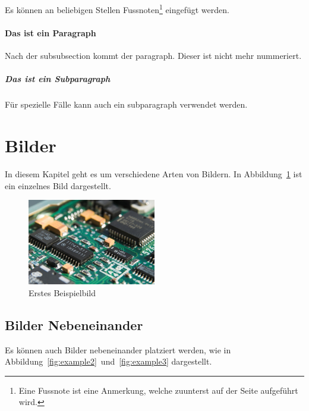 \documentclass[11pt,a4paper,hidelinks]{article}
\begin{document}
Es können an beliebigen Stellen Fussnoten\footnote{Eine Fussnote ist eine Anmerkung, welche zuunterst auf der Seite aufgeführt wird.} eingefügt werden.

\paragraph{Das ist ein Paragraph}

Nach der subsubsection kommt der paragraph. Dieser ist nicht mehr nummeriert.

\subparagraph{Das ist ein Subparagraph}

Für spezielle Fälle kann auch ein subparagraph verwendet werden.

\pagebreak

\section{Bilder}\label{sec:bilder}

In diesem Kapitel geht es um verschiedene Arten von Bildern. In Abbildung~\ref{fig:example1} ist ein einzelnes Bild dargestellt.

\begin{figure}[H]
    \centering
    \includegraphics[width=0.5\textwidth]{graphics/example1.jpg}
    \caption[Erstes Beispielbild]{Erstes Beispielbild \cite{pixabay2022pcb}}\label{fig:example1}
\end{figure}

\subsection{Bilder Nebeneinander}\label{sec_literaturreview}

Es können auch Bilder nebeneinander platziert werden, wie in Abbildung~\ref{fig:example2}~und~\ref{fig:example3} dargestellt.
\end{document}
